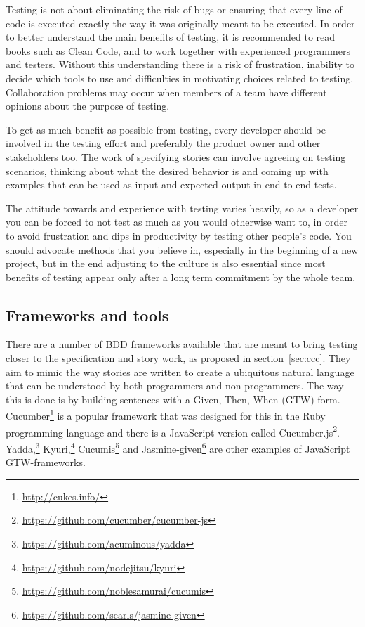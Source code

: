 \documentclass[11pt]{article}
\begin{document}
Testing is not about eliminating the risk of bugs or ensuring that every line of code is executed exactly the way it was originally meant to be executed. In order to better understand the main benefits of testing, it is recommended to read books such as Clean Code, and to work together with experienced programmers and testers. Without this understanding there is a risk of frustration, inability to decide which tools to use and difficulties in motivating choices related to testing. Collaboration problems may occur when members of a team have different opinions about the purpose of testing. \cite[question~38]{Edelstam}

To get as much benefit as possible from testing, every developer should be involved in the testing effort and preferably the product owner and other stakeholders too. The work of specifying stories can involve agreeing on testing scenarios, thinking about what the desired behavior is and coming up with examples that can be used as input and expected output in end-to-end tests. \cite[questions~39-40]{Edelstam}\cite[question~30]{Stenmark}

The attitude towards and experience with testing varies heavily, so as a developer you can be forced to not test as much as you would otherwise want to, in order to avoid frustration and dips in productivity by testing other people's code. You should advocate methods that you believe in, especially in the beginning of a new project, but in the end adjusting to the culture is also essential since most benefits of testing appear only after a long term commitment by the whole team. \cite[questions~31-32]{Stenmark}

\subsection{Frameworks and tools}

There are a number of BDD frameworks available that are meant to bring testing closer to the specification and story work, as proposed in section~\ref{sec:ccc}. They aim to mimic the way stories are written to create a ubiquitous natural language that can be understood by both programmers and non-programmers. The way this is done is by building sentences with a Given, Then, When (GTW) form. Cucumber\footnote{\url{http://cukes.info/}} is a popular framework that was designed for this in the Ruby programming language and there is a JavaScript version called Cucumber.js\footnote{\url{https://github.com/cucumber/cucumber-js}}.
Yadda,\footnote{\url{https://github.com/acuminous/yadda}}
Kyuri,\footnote{\url{https://github.com/nodejitsu/kyuri}}
Cucumis\footnote{\url{https://github.com/noblesamurai/cucumis}} and
Jasmine-given\footnote{\url{https://github.com/searls/jasmine-given}}
are other examples of JavaScript GTW-frameworks. \cite[section 8.4]{BDDJS}
\end{document}
